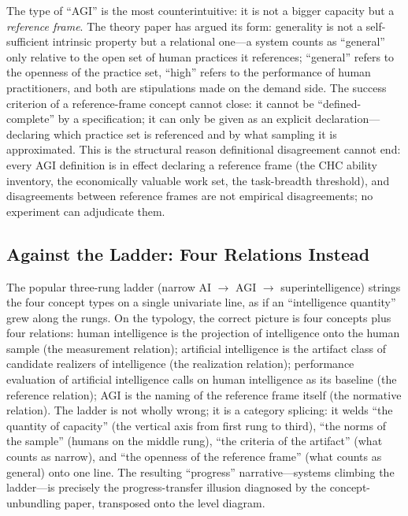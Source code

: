 \documentclass[10pt]{article}
\begin{document}
The type of ``AGI'' is the most counterintuitive: it is not a bigger capacity but a \emph{reference frame}. The theory paper has argued its form: generality is not a self-sufficient intrinsic property but a relational one---a system counts as ``general'' only relative to the open set of human practices it references; ``general'' refers to the openness of the practice set, ``high'' refers to the performance of human practitioners, and both are stipulations made on the demand side\cite{yu2026theory}. The success criterion of a reference-frame concept cannot close: it cannot be ``defined-complete'' by a specification; it can only be given as an explicit declaration---declaring which practice set is referenced and by what sampling it is approximated. This is the structural reason definitional disagreement cannot end: every AGI definition is in effect declaring a reference frame (the CHC ability inventory\cite{hendrycks2025definition}, the economically valuable work set\cite{openai2018charter}, the task-breadth threshold\cite{morris2023levels}), and disagreements between reference frames are not empirical disagreements; no experiment can adjudicate them.

\subsection{Against the Ladder: Four Relations Instead}

The popular three-rung ladder (narrow AI $\to$ AGI $\to$ superintelligence) strings the four concept types on a single univariate line, as if an ``intelligence quantity'' grew along the rungs. On the typology, the correct picture is four concepts plus four relations: human intelligence is the projection of intelligence onto the human sample (the measurement relation); artificial intelligence is the artifact class of candidate realizers of intelligence (the realization relation); performance evaluation of artificial intelligence calls on human intelligence as its baseline (the reference relation); AGI is the naming of the reference frame itself (the normative relation). The ladder is not wholly wrong; it is a category splicing: it welds ``the quantity of capacity'' (the vertical axis from first rung to third), ``the norms of the sample'' (humans on the middle rung), ``the criteria of the artifact'' (what counts as narrow), and ``the openness of the reference frame'' (what counts as general) onto one line. The resulting ``progress'' narrative---systems climbing the ladder---is precisely the progress-transfer illusion diagnosed by the concept-unbundling paper, transposed onto the level diagram\cite{yu2026twogoals}.
\end{document}
